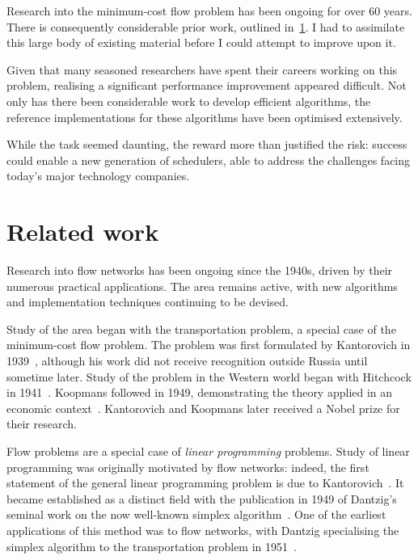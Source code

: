 Research into the minimum-cost flow problem has been ongoing for over 60 years. There is consequently considerable prior work, outlined in~\cref{sec:intro-related-work}. I had to assimilate this large body of existing material before I could attempt to improve upon it.

Given that many seasoned researchers have spent their careers working on this problem, realising a significant performance improvement appeared difficult. Not only has there been considerable work to develop efficient algorithms, the reference implementations for these algorithms have been optimised extensively.

While the task seemed daunting, the reward more than justified the risk: success could enable a new generation of schedulers, able to address the challenges facing today's major technology companies.

\section{Related work} \label{sec:intro-related-work}

Research into flow networks has been ongoing since the 1940s, driven by their numerous practical applications. The area remains active, with new algorithms and implementation techniques continuing to be devised.

Study of the area began with the transportation problem, a special case of the minimum-cost flow problem. The problem was first formulated by Kantorovich in 1939~\cite{Kantorovich:1960}, although his work did not receive recognition outside Russia until sometime later. Study of the problem in the Western world began with Hitchcock in 1941~\cite{Hitchcock:1941}. Koopmans followed in 1949, demonstrating the theory applied in an economic context~\cite{Koopmans:1949}. Kantorovich and Koopmans later received a Nobel prize for their research\footnotemark.

Flow problems are a special case of \emph{linear programming} problems. Study of linear programming was originally motivated by flow networks: indeed, the first statement of the general linear programming problem is due to Kantorovich~\cite{Kantorovich:1960}. It became established as a distinct field with the publication in 1949 of Dantzig's seminal work on the now well-known simplex algorithm~\cite{Dantzig:1949}. One of the earliest applications of this method was to flow networks, with Dantzig specialising the simplex algorithm to the transportation problem in 1951~\cite{Dantzig:1951}.

